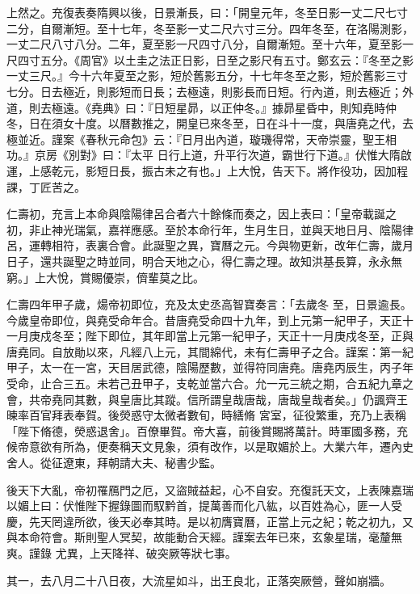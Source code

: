 \begin{pinyinscope}
 上然之。充復表奏隋興以後，日景漸長，曰：「開皇元年，冬至日影一丈二尺七寸二分，自爾漸短。至十七年，冬至影一丈二尺六寸三分。四年冬至，在洛陽測影，
 一丈二尺八寸八分。二年，夏至影一尺四寸八分，自爾漸短。至十六年，夏至影一尺四寸五分。《周官》以土圭之法正日影，日至之影尺有五寸。鄭玄云：『冬至之影一丈三尺。』今十六年夏至之影，短於舊影五分，十七年冬至之影，短於舊影三寸七分。日去極近，則影短而日長；去極遠，則影長而日短。行內道，則去極近；外道，則去極遠。《堯典》曰：『日短星昴，以正仲冬。』據昴星昏中，則知堯時仲冬，日在須女十度。以曆數推之，開皇已來冬至，日在斗十一度，與唐堯之代，去極並近。謹案《春秋元命包》云：『日月出內道，璇璣得常，天帝崇靈，聖王相功。』京房《別對》曰：『太平
 日行上道，升平行次道，霸世行下道。』伏惟大隋啟運，上感乾元，影短日長，振古未之有也。」上大悅，告天下。將作役功，因加程課，丁匠苦之。



 仁壽初，充言上本命與陰陽律呂合者六十餘條而奏之，因上表曰：「皇帝載誕之初，非止神光瑞氣，嘉祥應感。至於本命行年，生月生日，並與天地日月、陰陽律呂，運轉相符，表裏合會。此誕聖之異，寶曆之元。今與物更新，改年仁壽，歲月日子，還共誕聖之時並同，明合天地之心，得仁壽之理。故知洪基長算，永永無窮。」上大悅，賞賜優崇，儕輩莫之比。



 仁壽四年甲子歲，煬帝初即位，充及太史丞高智寶奏言：「去歲冬
 至，日景逾長。今歲皇帝即位，與堯受命年合。昔唐堯受命四十九年，到上元第一紀甲子，天正十一月庚戍冬至；陛下即位，其年即當上元第一紀甲子，天正十一月庚戍冬至，正與唐堯同。自放勛以來，凡經八上元，其間綿代，未有仁壽甲子之合。謹案：第一紀甲子，太一在一宮，天目居武德，陰陽歷數，並得符同唐堯。唐堯丙辰生，丙子年受命，止合三五。未若己丑甲子，支乾並當六合。允一元三統之期，合五紀九章之會，共帝堯同其數，與皇唐比其蹤。信所謂皇哉唐哉，唐哉皇哉者矣。」仍諷齊王暕率百官拜表奉賀。後熒惑守太微者數旬，時繕脩
 宮室，征役繁重，充乃上表稱「陛下脩德，熒惑退舍」。百僚畢賀。帝大喜，前後賞賜將萬計。時軍國多務，充候帝意欲有所為，便奏稱天文見象，須有改作，以是取媚於上。大業六年，遷內史舍人。從征遼東，拜朝請大夫、秘書少監。



 後天下大亂，帝初罹鴈門之厄，又盜賊益起，心不自安。充復託天文，上表陳嘉瑞以媚上曰：伏惟陛下握錄圖而馭黔首，提萬善而化八紘，以百姓為心，匪一人受慶，先天罔違所欲，後天必奉其時。是以初膺寶曆，正當上元之紀；乾之初九，又與本命符會。斯則聖人冥契，故能動合天經。謹案去年已來，玄象星瑞，毫釐無爽。謹錄
 尤異，上天降祥、破突厥等狀七事。



 其一，去八月二十八日夜，大流星如斗，出王良北，正落突厥營，聲如崩牆。




\end{pinyinscope}
